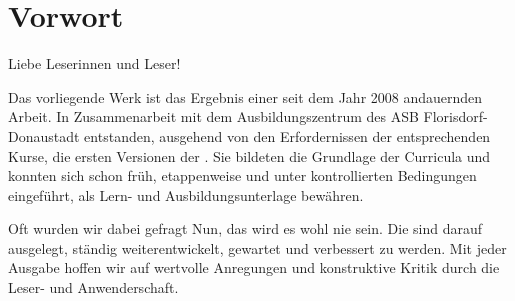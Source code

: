 \section{Vorwort}

{\ttfamily\color{BaseDark}

\noindent Liebe Leserinnen und Leser!

\bigskip

% 
% 
% 





Das vorliegende Werk ist das Ergebnis einer seit dem Jahr 2008 
andauernden Arbeit. 
%
In Zusammenarbeit mit dem
Ausbildungszentrum des ASB Florisdorf-Donaustadt
entstanden, 
ausgehend von den Erfordernissen
der entsprechenden Kurse, 
die ersten Versionen der {\AASS}.
%
Sie bildeten die Grundlage der Curricula 
und konnten sich schon früh, 
etappenweise und unter kontrollierten Bedingungen eingeführt, 
als Lern- und Ausbildungsunterlage bewähren.


Oft wurden wir dabei
gefragt  
Nun, das wird es wohl nie sein. 
Die {\AASS} sind darauf ausgelegt,
ständig weiterentwickelt, gewartet und verbessert zu werden. 
Mit jeder Ausgabe hoffen wir
auf wertvolle Anregungen und konstruktive Kritik durch die
Leser- und Anwenderschaft.


}
